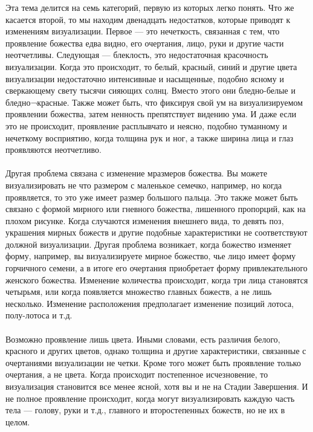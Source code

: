 \begin{siderules}
Эта тема делится на семь категорий, первую из которых легко понять. Что же касается
второй, то мы находим двенадцать недостатков, которые приводят к изменениям
визуализации. Первое — это нечеткость, связанная с тем, что проявление божества едва
видно, его очертания, лицо, руки и другие части неотчетливы. Следующая — блеклость, это
недостаточная красочность визуализации. Когда это происходит, то белый, красный, синий и
другие цвета визуализации недостаточно интенсивные и насыщенные, подобно ясному и
сверкающему свету тысячи сияющих солнц. Вместо этого они бледно-белые и бледно¬красные.
Также может быть, что фиксируя свой ум на визуализируемом проявлении
божества, затем ненность препятствует видению ума. И даже если это не происходит,
проявление расплывчато и неясно, подобно туманному и нечеткому восприятию, когда
толщина рук и ног, а также ширина лица и глаз проявляются неотчетливо.\\
\\
Другая проблема связана с изменение мразмеров божества. Вы можете визуализировать
не что размером с маленькое семечко, например, но когда проявляется, то это уже имеет
размер большого пальца. Это также может быть связано с формой мирного или гневного
божества, лишенного пропорций, как на плохом рисунке. Когда случаются изменения
внешнего вида, то девять поз, украшения мирных божеств и другие подобные
характеристики не соответствуют должной визуализации. Другая проблема возникает, когда
божество изменяет форму, например, вы визуализируете мирное божество, чье лицо имеет
форму горчичного семени, а в итоге его очертания приобретает форму привлекательного
женского божества. Изменение количества происходит, когда три лица становятся четырьмя,
или когда появляется множество главных божеств, а не лишь несколько. Изменение
расположения предполагает изменение позиций лотоса, полу-лотоса и т.д.\\
\\
Возможно проявление лишь цвета. Иными словами, есть различия белого, красного и других
цветов, однако толщина и другие характеристики, связанные с очертаниями визуализации не
четки. Кроме того может быть проявление только очертания, а не цвета. Когда происходит
постепенное исчезновение, то визуализация становится все менее ясной, хотя вы и не на
Стадии Завершения. И не полное проявление происходит, когда могут визуализировать
каждую часть тела — голову, руки и т.д., главного и второстепенных божеств, но не их в
целом.\\
\\

\end{siderules}

